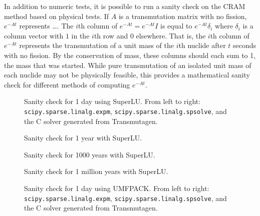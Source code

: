 In addition to numeric tests, it is possible to run a sanity check on the CRAM
method based on physical tests. If $A$ is a transmutation matrix with no
fission, $e^{-At}$ represents {\color{red}\ldots}. The $i$th column of
$e^{-At}=e^{-At}I$ is equal to $e^{-At}\delta_{i}$ where $\delta_i$ is a
column vector with $1$ in the $i$th row and $0$ elsewhere. That is, the $i$th
column of $e^{-At}$ represents the transmutation of a unit mass of the $i$th
nuclide after $t$ seconds with no fission. By the conservation of mass, these
columns should each sum to 1, the mass that was started. While pure
transmutation of an isolated unit mass of each nuclide may not be physically
feasible, this provides a mathematical sanity check for different methods of
computing $e^{-At}$.


\begin{figure}[!ht]
\centering
\resizebox{0.9\textwidth}{!}{}
\caption{Sanity check for 1 day using SuperLU. From left to right:
\texttt{scipy.\allowbreak{}sparse.\allowbreak{}linalg.\allowbreak{}expm},
\texttt{scipy.\allowbreak{}sparse.\allowbreak{}linalg.\allowbreak{}spsolve},
and the C solver generated from Transmutagen.}
\label{fig:nofission-pwru50-1-day-superlu}
\end{figure}

\begin{figure}[!ht]
\centering
\resizebox{0.9\textwidth}{!}{}
\caption{Sanity check for 1 year with SuperLU.}
\label{fig:nofission-pwru50-1-year-superlu}
\end{figure}

\begin{figure}[!ht]
\centering
\resizebox{0.9\textwidth}{!}{}
\caption{Sanity check for 1000 years with SuperLU.}
\label{fig:nofission-pwru50-1000-years-superlu}
\end{figure}

\begin{figure}[!ht]
\centering
\resizebox{0.9\textwidth}{!}{}
\caption{Sanity check for 1 million years with SuperLU.}
\label{fig:nofission-pwru50-1-million-years-superlu}
\end{figure}

\begin{figure}[!ht]
\centering
\resizebox{0.9\textwidth}{!}{}
\caption{Sanity check for 1 day using UMFPACK. From left to right:
\texttt{scipy.\allowbreak{}sparse.\allowbreak{}linalg.\allowbreak{}expm},
\texttt{scipy.\allowbreak{}sparse.\allowbreak{}linalg.\allowbreak{}spsolve},
and the C solver generated from Transmutagen.}
\label{fig:nofission-pwru50-1-day-umfpack}
\end{figure}

